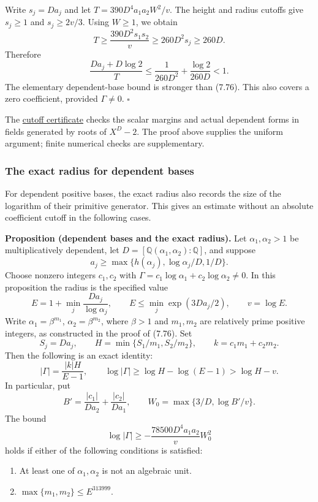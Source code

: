 \documentclass[
  11pt,
  a4paper,
]{article}
\providecommand{\tightlist}{%
  \setlength{\itemsep}{0pt}\setlength{\parskip}{0pt}}
\begin{document}
Write \(s_j=Da_j\) and let \(T=390D^4a_1a_2W^2/v\). The height and
radius cutoffs give \(s_j\ge1\) and \(s_j\ge2v/3\). Using \(W\ge1\), we
obtain \[
T\ge\frac{390D^2s_1s_2}{v}
\ge260D^2s_j\ge260D.
\] Therefore \[
\frac{Da_j+D\log2}{T}
\le\frac1{260D^2}+\frac{\log2}{260D}<1.
\] The elementary dependent-base bound is stronger than (7.76). This
also covers a zero coefficient, provided \(\Gamma\ne0\). \(\square\)

The \href{https://kokunoyumeto.github.io/open-math-courses-public/courses/TR-BAKER/verification/real_radius_cutoff.py}{cutoff certificate}
checks the scalar margins and actual dependent forms in fields generated
by roots of \(X^D-2\). The proof above supplies the uniform argument;
finite numerical checks are supplementary.

\subsubsection{The exact radius for dependent
bases}\label{the-exact-radius-for-dependent-bases}

For dependent positive bases, the exact radius also records the size of
the logarithm of their primitive generator. This gives an estimate
without an absolute coefficient cutoff in the following cases.

\textbf{Proposition (dependent bases and the exact radius).} Let
\(\alpha_1,\alpha_2>1\) be multiplicatively dependent, let
\(D=[\mathbb Q(\alpha_1,\alpha_2):\mathbb Q]\), and suppose \[
a_j\ge\max\{h(\alpha_j),\log\alpha_j/D,1/D\}.
\] Choose nonzero integers \(c_1,c_2\) with
\(\Gamma=c_1\log\alpha_1+c_2\log\alpha_2\ne0\). In this proposition the
radius is the specified value \[
E=1+\min_j\frac{Da_j}{\log\alpha_j},\qquad
E\le\min_j\exp(3Da_j/2),\qquad v=\log E.
\tag{7.77}
\] Write \(\alpha_1=\beta^{m_1}\), \(\alpha_2=\beta^{m_2}\), where
\(\beta>1\) and \(m_1,m_2\) are relatively prime positive integers, as
constructed in the proof of (7.76). Set \[
S_j=Da_j,\qquad
H=\min\{S_1/m_1,S_2/m_2\},\qquad
k=c_1m_1+c_2m_2.
\] Then the following is an exact identity: \[
|\Gamma|=\frac{|k|H}{E-1},\qquad
\log|\Gamma|\ge\log H-\log(E-1)>\log H-v.
\tag{7.78}
\] In particular, put \[
B'=\frac{|c_1|}{Da_2}+\frac{|c_2|}{Da_1},\qquad
W_0=\max\{3/D,\log B'/v\}.
\] The bound \[
\log|\Gamma|\ge
-\frac{78500D^4a_1a_2}{v}W_0^2
\tag{7.79}
\] holds if either of the following conditions is satisfied:

\begin{enumerate}
\def\labelenumi{\arabic{enumi}.}
\tightlist
\item
  At least one of \(\alpha_1,\alpha_2\) is not an algebraic unit.
\item
  \(\max\{m_1,m_2\}\le E^{313999}\).
\end{enumerate}
\end{document}
